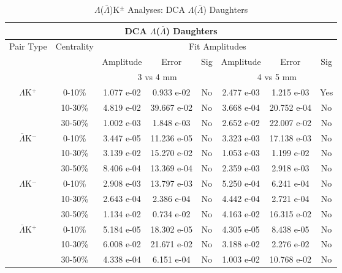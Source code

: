 \documentclass[../AnalysisNoteJBuxton.tex]{subfiles}
\begin{document}
\begin{table}
 \centering
 \begin{tabular}{|c|c|c|c|c||c|c|c|}
  \multicolumn{8}{c}{DCA $\Lambda$($\bar{\Lambda}$) Daughters} \\
  \hline
  \multirow{3}{*}{Pair Type} & \multirow{3}{*}{Centrality} & \multicolumn{6}{c|}{Fit Amplitudes} \\
  \cline{3-8}
   & & Amplitude & Error & Sig & Amplitude & Error & Sig \\  
  \cline{3-8}
   & & \multicolumn{3}{c||}{3 vs 4 mm} & \multicolumn{3}{c|}{4 vs 5 mm} \\  
  \hline
  \multirow{3}{*}{$\Lambda$K$^{+}$}
   &  0-10\% & 1.077 e-02 & 0.933 e-02 & No & 2.477 e-03 & 1.215 e-03 & Yes \\
   & 10-30\% & 4.819 e-02 & 39.667 e-02 & No & 3.668 e-04 & 20.752 e-04 & No \\
   & 30-50\% & 1.002 e-03 & 1.848 e-03 & No & 2.652 e-02 & 22.007 e-02 & No \\
  \hline
  \multirow{3}{*}{$\bar{\Lambda}$K$^{-}$}
   &  0-10\% & 3.447 e-05 & 11.236 e-05 & No & 3.323 e-03 & 17.138 e-03 & No \\
   & 10-30\% & 3.139 e-02 & 15.270 e-02 & No & 1.053 e-03 & 1.199 e-02 & No \\
   & 30-50\% & 8.406 e-04 & 13.369 e-04 & No & 2.359 e-03 & 2.918 e-03 & No \\
  \hline \hline
  \multirow{3}{*}{$\Lambda$K$^{-}$}
   &  0-10\% & 2.908 e-03 & 13.797 e-03 & No & 5.250 e-04 & 6.241 e-04 & No \\
   & 10-30\% & 2.643 e-04 & 2.386 e-04 & No & 4.442 e-04 & 2.721 e-04 & No \\
   & 30-50\% & 1.134 e-02 & 0.734 e-02 & No & 4.163 e-02 & 16.315 e-02 & No \\
  \hline
  \multirow{3}{*}{$\bar{\Lambda}$K$^{+}$}
   &  0-10\% & 5.184 e-05 & 18.302 e-05 & No & 4.305 e-05 & 8.438 e-05 & No \\
   & 10-30\% & 6.008 e-02 & 21.671 e-02 & No & 3.188 e-02 & 2.276 e-02 & No \\
   & 30-50\% & 4.338 e-04 & 6.151 e-04 & No & 1.003 e-02 & 10.768 e-02 & No \\
  \hline
 \end{tabular}
 \caption{$\Lambda$($\bar{\Lambda}$)K$^{\pm}$ Analyses: DCA $\Lambda$($\bar{\Lambda}$) Daughters}
 \label{tab:LamDaughtersDcaLamKch}
\end{table}
\end{document}
